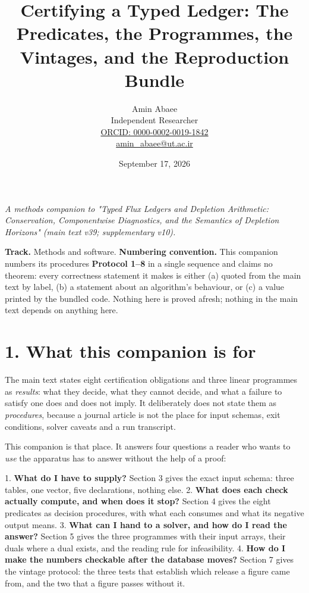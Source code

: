 \documentclass[11pt]{article}
\begin{document}
\title{Certifying a Typed Ledger: The Predicates, the Programmes, the Vintages, and the Reproduction Bundle}
\author{Amin Abaee\\[0.35em]
{\small Independent Researcher}\\[0.55em]
{\small\href{https://orcid.org/0000-0002-0019-1842}{ORCID: 0000-0002-0019-1842}}\\[0.3em]
{\small\href{mailto:amin\_abaee@ut.ac.ir}{amin\_abaee@ut.ac.ir}}}
\date{September 17, 2026}
\maketitle

\emph{A methods companion to "Typed Flux Ledgers and Depletion Arithmetic: Conservation, Componentwise Diagnostics, and the Semantics of Depletion Horizons" (main text v39; supplementary v10).}

\textbf{Track.} Methods and software. \textbf{Numbering convention.} This companion numbers its procedures \textbf{Protocol 1--8} in a single sequence and claims no theorem: every correctness statement it makes is either (a) quoted from the main text by label, (b) a statement about an algorithm's behaviour, or (c) a value printed by the bundled code. Nothing here is proved afresh; nothing in the main text depends on anything here.

\vspace{0.8em}

\section*{1. What this companion is for}\label{1-what-this-companion-is-for}

The main text states eight certification obligations and three linear programmes as \emph{results}: what they decide, what they cannot decide, and what a failure to satisfy one does and does not imply. It deliberately does not state them as \emph{procedures}, because a journal article is not the place for input schemas, exit conditions, solver caveats and a run transcript.

This companion is that place. It answers four questions a reader who wants to \emph{use} the apparatus has to answer without the help of a proof:

1. \textbf{What do I have to supply?} Section 3 gives the exact input schema: three tables, one vector, five declarations, nothing else. 2. \textbf{What does each check actually compute, and when does it stop?} Section 4 gives the eight predicates as decision procedures, with what each consumes and what its negative output means. 3. \textbf{What can I hand to a solver, and how do I read the answer?} Section 5 gives the three programmes with their input arrays, their duals where a dual exists, and the reading rule for infeasibility. 4. \textbf{How do I make the numbers checkable after the database moves?} Section 7 gives the vintage protocol: the three tests that establish which release a figure came from, and the two that a figure passes without it.
\end{document}
